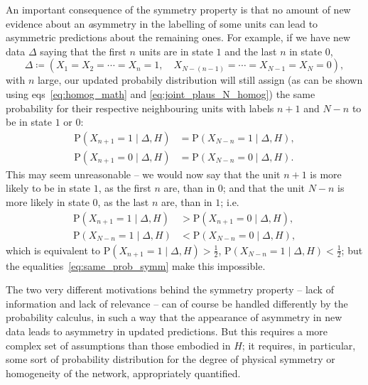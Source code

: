 \documentclass{article}
\theoremstyle{innote}
\newcommand*{\yH}{\varEta}
\newcommand*{\yD}{\varDelta}
\newcommand*{\ie}{{i.e.}}
\newcommand*{\defd}{\coloneqq}
\newcommand*{\cond}%
{\mathpunct{|}}%
\newcommand*{\p}{\mathrm{P}}%
\renewcommand*{\|}{\cond}
\newcommand*{\+}{\lor}
\newcommand*{\eqns}{eqs}%
\let\varEta H
\begin{document}
An important consequence of the symmetry property is that no amount of new
evidence about an \emph{a}symmetry in the labelling of some units can lead
to asymmetric predictions about the remaining ones. For example, if we have
new data $\yD$ saying that the first $n$ units are in state $1$ and the
last $n$ in state $0$,
\begin{equation}
 \yD \defd (X_1 = X_2 = \dotsb = X_n =1,\quad
X_{N-(n-1)}= \dotsb = X_{N-1} = X_N = 0),
\end{equation}
with $n$ large, our updated probabily distribution will still assign (as
can be shown using \eqns~\eqref{eq:homog_math} and
\eqref{eq:joint_plaus_N_homog}) the same probability for their respective
neighbouring units with labels $n+1$ and $N-n$ to be in state $1$ or $0$:
\begin{equation}
  \label{eq:same_prob_symm}
  \begin{split}
  \p(X_{n+1} =1 \cond \yD,\yH) &= \p(X_{N-n} =1 \cond \yD,\yH),
  \\
  \p(X_{n+1} =0 \cond \yD,\yH) &= \p(X_{N-n} =0 \cond \yD,\yH).
\end{split}
\end{equation}
This may seem unreasonable -- we would now say that the unit $n+1$ is more
likely to be in state $1$, as the first $n$ are, than in $0$; and that the
unit $N-n$ is more likely in state $0$, as the last $n$ are, than in $1$;
\ie
\begin{equation}
  \label{eq:wished_result}
  \begin{split}
  \p(X_{n+1} = 1 \cond \yD,\yH) &>  \p(X_{n+1} = 0 \cond \yD,\yH),
\\
  \p(X_{N-n} = 1 \cond \yD,\yH) &<  \p(X_{N-n} = 0 \cond \yD,\yH),
\end{split}
\end{equation}
which is equivalent to $\p(X_{n+1} = 1 \cond \yD,\yH) > \tfrac{1}{2}$,
$\p(X_{N-n} = 1 \cond \yD,\yH) < \tfrac{1}{2}$; but the
equalities~\eqref{eq:same_prob_symm} make this impossible.

The two very different motivations behind the symmetry property -- lack of
information and lack of relevance -- can of course be handled differently
by the probability calculus, in such a way that the appearance of asymmetry
in new data leads to asymmetry in updated predictions. But this requires a
more complex set of assumptions than those embodied in $\yH$; it requires,
in particular, some sort of probability distribution for the degree of
physical symmetry or homogeneity of the network, appropriately quantified.
\end{document}
